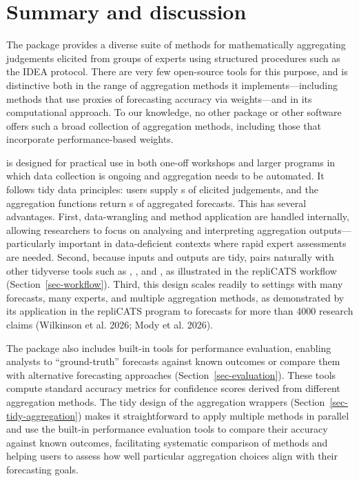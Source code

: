 \documentclass[
  11pt,
  a4paper,
]{article}
\begin{document}
\section{Summary and discussion}\label{sec-summary}

The  package provides a diverse suite of methods for
mathematically aggregating judgements elicited from groups of experts
using structured procedures such as the IDEA protocol. There are very
few open-source tools for this purpose, and  is
distinctive both in the range of aggregation methods it
implements---including methods that use proxies of forecasting accuracy
via weights---and in its computational approach. To our knowledge, no
other  package or other software offers such a broad
collection of aggregation methods, including those that incorporate
performance-based weights.

 is designed for practical use in both one-off workshops
and larger programs in which data collection is ongoing and aggregation
needs to be automated. It follows tidy data principles: users supply
s of elicited judgements, and the aggregation
functions return s of aggregated forecasts. This has
several advantages. First, data-wrangling and method application are
handled internally, allowing researchers to focus on analysing and
interpreting aggregation outputs---particularly important in
data-deficient contexts where rapid expert assessments are needed.
Second, because inputs and outputs are tidy,  pairs
naturally with other tidyverse tools such as , ,
and , as illustrated in the repliCATS workflow
(Section~\ref{sec-workflow}). Third, this design scales readily to
settings with many forecasts, many experts, and multiple aggregation
methods, as demonstrated by its application in the repliCATS program to
forecasts for more than 4000 research claims (Wilkinson et al. 2026;
Mody et al. 2026).

The package also includes built-in tools for performance evaluation,
enabling analysts to ``ground-truth'' forecasts against known outcomes
or compare them with alternative forecasting approaches
(Section~\ref{sec-evaluation}). These tools compute standard accuracy
metrics for confidence scores derived from different aggregation
methods. The tidy design of the aggregation wrappers
(Section~\ref{sec-tidy-aggregation}) makes it straightforward to apply
multiple methods in parallel and use the built-in performance evaluation
tools to compare their accuracy against known outcomes, facilitating
systematic comparison of methods and helping users to assess how well
particular aggregation choices align with their forecasting goals.
\end{document}
